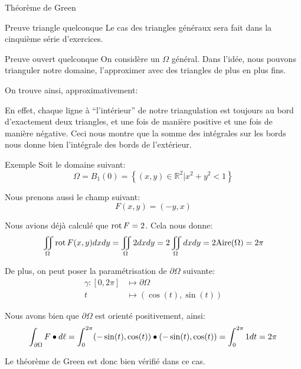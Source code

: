 \documentclass[a4paper]{article}
\begin{document}
\begin{parag}{Théorème de Green}
    \begin{subparag}{Preuve triangle quelconque}
        Le cas des triangles généraux sera fait dans la cinquième série d'exercices.
    \end{subparag}
    
    \begin{subparag}{Preuve ouvert quelconque}
        On considère un $\Omega$ général. Dans l'idée, nous pouvons trianguler notre domaine, l'approximer avec des triangles de plus en plus fins.

        On trouve ainsi, approximativement: 
        
        En effet, chaque ligne à ``l'intérieur'' de notre triangulation est toujours au bord d'exactement deux triangles, et une fois de manière positive et une fois de manière négative. Ceci nous montre que la somme des intégrales sur les bords nous donne bien l'intégrale des bords de l'extérieur.
    \end{subparag}
    
\end{parag}

\begin{parag}{Exemple}
    Soit le domaine suivant: 
    \[\Omega = B_1\left(0\right) = \left\{\left(x, y\right) \in \mathbb{R}^2 | x^2 + y^2 < 1\right\}\]
    
    Nous prenons aussi le champ suivant: 
    \[F\left(x, y\right) = \left(-y, x\right)\]
    
    Nous avions déjà calculé que $\operatorname{rot} F = 2$. Cela nous donne: 
    \[\iint_{\Omega} \rot F \left(x,y\right) dxdy = \iint_{\Omega} 2dxdy = 2\iint_{\Omega}dxdy = 2 \text{Aire}\left(\Omega\right) = 2\pi\]
    
    De plus, on peut poser la paramétrisation de $\partial \Omega$ suivante:
    \[\begin{split}
    \gamma: \left[0, 2\pi\right] &\longmapsto \partial \Omega \\
    t &\longmapsto \left(\cos\left(t\right), \sin\left(t\right)\right)
    \end{split}\]
    
    Nous avons bien que $\partial \Omega$ est orienté positivement, ainsi: 
    \[\int_{\partial \Omega} F \dotprod d \ell = \int_{0}^{2\pi} \left(-\sin\left(t\right), \cos\left(t\right)\right) \dotprod \left(-\sin\left(t\right), \cos\left(t\right)\right) = \int_{0}^{2\pi} 1dt = 2\pi\]
    
    Le théorème de Green est donc bien vérifié dans ce cas.
\end{parag}
\end{document}
